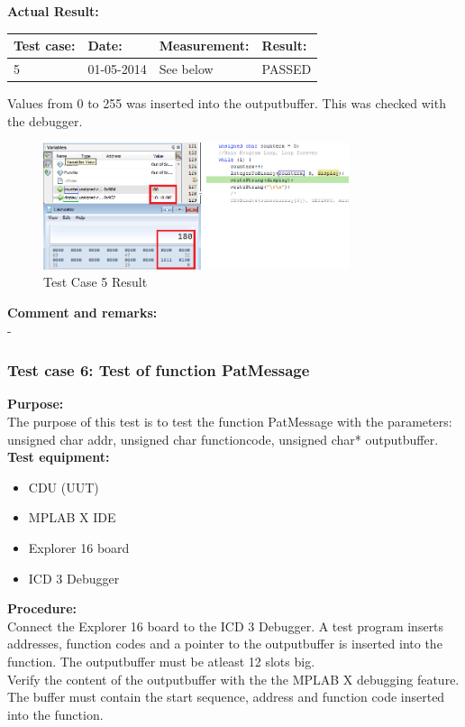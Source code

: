 \textbf{Actual Result:}\\
\begin{table}[H]
\centering
\begin{tabular}{|p{2cm}|p{2cm}|p{3cm}|p{2cm}|}\hline
\textbf{Test case:} & \textbf{Date:} & \textbf{Measurement:} & \textbf{Result:} \\ \hline
5 & 01-05-2014 & See below & PASSED \\ \hline
\end{tabular}
\end{table}
Values from 0 to 255 was inserted into the outputbuffer. This was checked with the debugger.\\
\begin{figure}[H]
\centering
\includegraphics[width=0.8\textwidth]{billeder/CDUtestcase5}
\caption{Test Case 5 Result}
\label{fig:cdutestcase5}
\end{figure} 

\textbf{Comment and remarks:}\\
-\\

\subsubsection{Test case 6: Test of function PatMessage }
\textbf{Purpose:}\\
The purpose of this test is to test the function PatMessage with the parameters: unsigned char addr, unsigned char functioncode, unsigned char* outputbuffer.\\

\textbf{Test equipment:}
\begin{itemize}
\item CDU (UUT)
\item MPLAB X IDE
\item Explorer 16 board
\item ICD 3 Debugger
\end{itemize}

\textbf{Procedure:}\\
Connect the Explorer 16 board to the ICD 3 Debugger. A test program inserts addresses, function codes and a pointer to the outputbuffer is inserted into the function. The outputbuffer must be atleast 12 slots big.\\
Verify the content of the outputbuffer with the the MPLAB X debugging feature. The buffer must contain the start sequence, address and function code inserted into the function.\\

